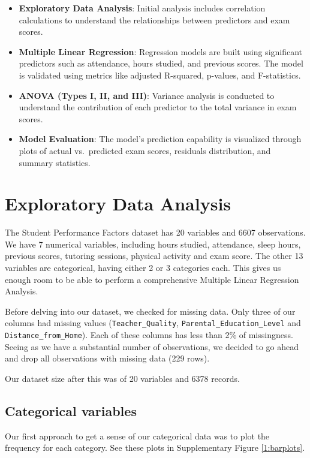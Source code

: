 \documentclass[twocolumn]{article} %
\begin{document}
\begin{itemize}
\item
  \textbf{Exploratory Data Analysis}:
  Initial analysis includes
  correlation calculations to understand the relationships between
  predictors and exam scores.
\item
  \textbf{Multiple Linear Regression}:
  Regression models are built using
  significant predictors such as attendance, hours studied, and previous
  scores. The model is validated using metrics like adjusted R-squared,
  p-values, and F-statistics.
\item
  \textbf{ANOVA (Types I, II, and III)}:
  Variance analysis is conducted
  to understand the contribution of each predictor to the total variance
  in exam scores.
\item
  \textbf{Model Evaluation}:
  The model's prediction capability is
  visualized through plots of actual vs.~predicted exam scores,
  residuals distribution, and summary statistics.
\end{itemize}


\section{Exploratory Data Analysis}
The Student Performance Factors dataset has 20 variables and 6607 observations. We have 7 numerical variables, including hours studied, attendance, sleep hours, previous scores, tutoring sessions, physical activity and exam score. The other 13 variables are categorical, having either 2 or 3 categories each.
This gives us enough room to be able to perform a comprehensive Multiple Linear Regression Analysis.

Before delving into our dataset, we checked for missing data. Only three of our columns had missing values (\texttt{Teacher\_Quality}, \texttt{Parental\_Education\_Level} and \texttt{Distance\_from\_Home}). Each of these columns has less than 2\% of missingness. Seeing as we have a substantial number of observations, we decided to go ahead and drop all observations with missing data (229 rows).

Our dataset size after this was of 20 variables and 6378 records.

\subsection*{Categorical variables}

Our first approach to get a sense of our categorical data was to plot the frequency for each category. See these plots in Supplementary Figure \ref{1:barplots}.
\end{document}
